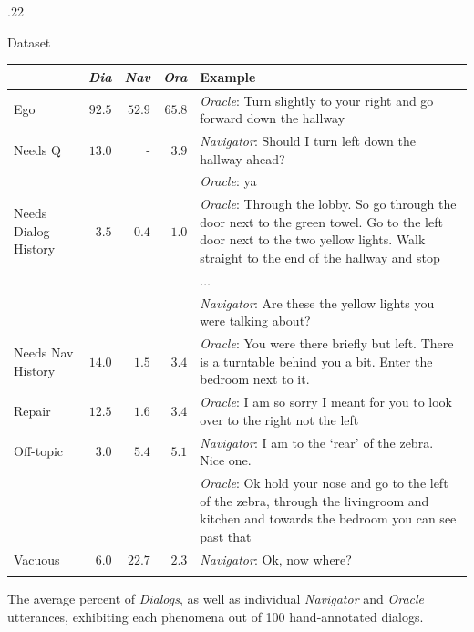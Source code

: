 \documentclass[final]{beamer}
\newcommand{\setblocksize}{\LARGE \centering}
\newcommand{\sidecolumnwidth}{.22}
\newcommand{\nav}{\textit{Navigator}}
\newcommand{\ora}{\textit{Oracle}}
\begin{document}
\begin{frame}{}
\begin{columns}[t]
\begin{column}{\sidecolumnwidth\linewidth}
\begin{block}{\setblocksize Dataset}
{\begin{table}[ht]
\centering
\begin{footnotesize}
\begin{tabular}{p{2cm}rrrp{10cm}}
    & \textbf{\textit{Dia}} & \textbf{\textit{Nav}} & \textbf{\textit{Ora}} & \textbf{Example} \\
    \toprule
    Ego & $92.5$ & $52.9$ & $65.8$ & \ora{}: Turn slightly to {\color{blue}your right} and go {\color{blue}forward} down the hallway \\
    \cmidrule{5-5}
    Needs Q & $13.0$ & - & $3.9$ & \nav{}: Should I turn left down the hallway ahead? \\
    & & & &  \ora{}: {\color{blue}ya} \\
    \cmidrule{5-5}
    Needs Dialog History & $3.5$ & $0.4$ & $1.0$ & \ora{}: Through the lobby. So go through the door next to the green towel. Go to the left door next to {\color{blue}the two yellow lights}. Walk straight to the end of the hallway and stop \\
    & & & & $\dots$ \\
    & & & & \nav{}: Are these {\color{blue}the yellow lights} you were talking about? \\
    \cmidrule{5-5}
    Needs Nav History & $14.0$ & $1.5$ & $3.4$ & \ora{}: {\color{blue}You were there briefly but left}. There is a turntable behind you a bit. Enter the bedroom next to it. \\
    \cmidrule{5-5}
    Repair & $12.5$ & $1.6$ & $3.4$ & \ora{}: I am so sorry {\color{blue}I meant for you to look over to the right not the left} \\
    \cmidrule{5-5}
    Off-topic & $3.0$ & $5.4$ & $5.1$ & \nav{}: I am to the `rear' of the zebra. {\color{blue}Nice one.} \\
    & & & & \ora{}: {\color{blue}Ok hold your nose} and go to the left of the zebra, through the livingroom and kitchen and towards the bedroom you can see past that \\
    \cmidrule{5-5}
    Vacuous & $6.0$ & $22.7$ & $2.3$ & \nav{}: {\color{blue}Ok, now where?} \\
    \bottomrule \\
\end{tabular}
\end{footnotesize}
\vspace{-8mm}
\end{table}
The average percent of \textit{Dialogs}, as well as individual \nav{} and \ora{} utterances, exhibiting each phenomena out of 100 hand-annotated dialogs.

}
\end{block}
\end{column}
\end{columns}
\end{frame}
\end{document}
